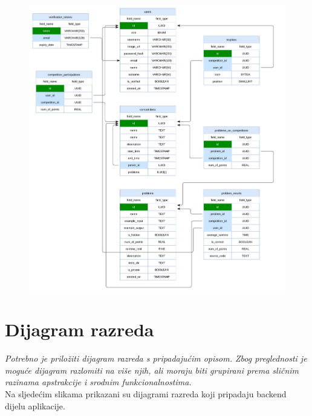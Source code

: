 				\begin{figure}[htbp]
					\centering
					\includegraphics[width=\linewidth]{slike/db_dijagram.png}
				\end{figure}

			\eject
			
			
		\section{Dijagram razreda}
		
			\textit{Potrebno je priložiti dijagram razreda s pripadajućim opisom. Zbog preglednosti je moguće dijagram razlomiti na više njih, ali moraju biti grupirani prema sličnim razinama apstrakcije i srodnim funkcionalnostima.}\\
			
			Na sljedećim slikama prikazani su dijagrami razreda koji pripadaju backend dijelu aplikacije.
			
